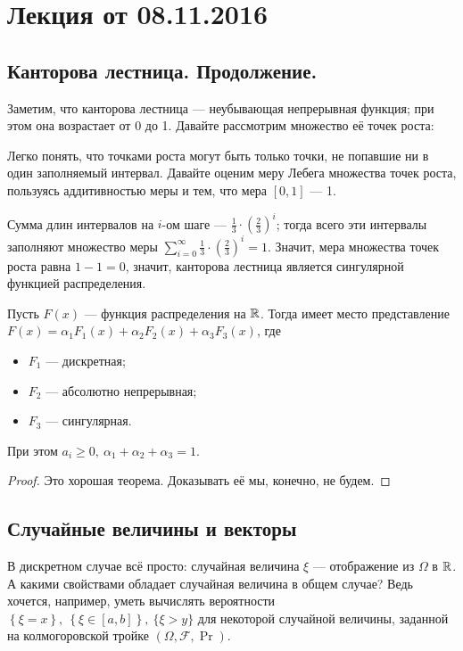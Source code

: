 \section{Лекция от 08.11.2016}

\subsection{Канторова лестница. Продолжение.}

Заметим, что канторова лестница --- неубывающая непрерывная функция; при этом она возрастает от 0 до 1.
Давайте рассмотрим множество её точек роста:

Легко понять, что точками роста могут быть только точки, не попавшие ни в один заполняемый интервал. Давайте
оценим меру Лебега множества точек роста, пользуясь аддитивностью меры и тем, что мера $[0, 1]$ --- 1.

Сумма длин интервалов на $i$-ом шаге --- $\frac{1}{3}\cdot\left(\frac{2}{3}\right)^i$; тогда всего
эти интервалы заполняют множество меры
$\sum\limits_{i = 0}^{\infty}\frac{1}{3}\cdot\left(\frac{2}{3}\right)^i = 1$. Значит, мера множества точек
роста равна $1-1 = 0$, значит, канторова лестница является сингулярной функцией распределения.

\begin{theorem}[Лебег]
    Пусть $F(x)$ --- функция распределения на $\mathbb{R}$. Тогда имеет место представление
    $F(x) = \alpha_1 F_1(x) + \alpha_2 F_2(x) + \alpha_3 F_3(x)$, где
    \begin{itemize}
        \item $F_1$ --- дискретная;
        \item $F_2$ --- абсолютно непрерывная;
        \item $F_3$ --- сингулярная.
    \end{itemize}

    При этом $a_i \geq 0,\ \alpha_1 + \alpha_2 + \alpha_3 = 1$.
\end{theorem}

\begin{proof}
    Это хорошая теорема. Доказывать её мы, конечно, не будем.
\end{proof}

\subsection{Случайные величины и векторы}

В дискретном случае всё просто: случайная величина $\xi$ --- отображение из $\Omega$ в $\mathbb{R}$. А какими
свойствами обладает случайная величина в общем случае? Ведь хочется, например, уметь вычислять вероятности
$\left\{ \xi = x \right\},\ \left\{ \xi \in [a, b] \right\},\ \{\xi > y\}$ для некоторой случайной величины,
заданной на колмогоровской тройке $(\Omega, \mathcal{F}, \Pr)$.

